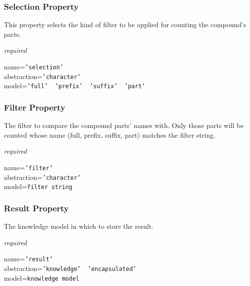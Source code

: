\subsubsection{Selection Property}

This property selects the kind of filter to be applied for counting the
compound's parts.

\emph{required}

name=\texttt{'selection'}\\
abstraction=\texttt{'character'}\\
model=\texttt{'full' \vline\ 'prefix' \vline\ 'suffix' \vline\ 'part'}

\subsubsection{Filter Property}

The filter to compare the compound parts' names with. Only those parts will be
counted whose name (full, prefix, suffix, part) matches the filter string.

\emph{required}

name=\texttt{'filter'}\\
abstraction=\texttt{'character'}\\
model=\texttt{filter string}

\subsubsection{Result Property}

The knowledge model in which to store the result.

\emph{required}

name=\texttt{'result'}\\
abstraction=\texttt{'knowledge' \vline\ 'encapsulated'}\\
model=\texttt{knowledge model}
